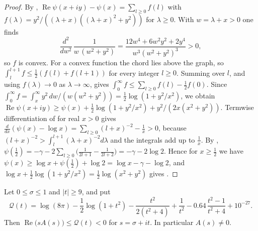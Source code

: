\begin{proof}
By , $\operatorname{Re}\psi(x+iy)-\psi(x)=\sum_{l\ge0}f(l)$ with $f(\lambda)=y^2/((\lambda+x)((\lambda+x)^2+y^2))$ for $\lambda\ge0$. With $w=\lambda+x>0$ one finds
\begin{equation}\label{eq:convex}
\frac{d^2}{dw^2}\,\frac1{w\,(w^2+y^2)}=\frac{12w^4+6w^2y^2+2y^4}{w^3(w^2+y^2)^3}>0,
\end{equation}
so $f$ is convex. For a convex function the chord lies above the graph, so $\int_l^{l+1}f\le\frac12(f(l)+f(l+1))$ for every integer $l\ge0$. Summing over $l$, and using $f(\lambda)\to0$ as $\lambda\to\infty$, gives $\int_0^\infty f\le\sum_{l\ge0}f(l)-\frac12f(0)$. Since $\int_0^\infty f=\int_x^\infty y^2\,dw/(w(w^2+y^2))=\frac12\log(1+y^2/x^2)$, we obtain $\operatorname{Re}\psi(x+iy)\ge\psi(x)+\frac12\log(1+y^2/x^2)+y^2/(2x(x^2+y^2))$. Termwise differentiation of  for real $x>0$ gives $\frac{d}{dx}(\psi(x)-\log x)=\sum_{l\ge0}(l+x)^{-2}-\frac1x>0$, because $(l+x)^{-2}>\int_l^{l+1}(\lambda+x)^{-2}d\lambda$ and the integrals add up to $\frac1x$. By , $\psi(\frac12)=-\gamma-2\sum_{l\ge0}\bigl(\frac1{2l+1}-\frac1{2l+2}\bigr)=-\gamma-2\log2$. Hence for $x\ge\frac12$ we have $\psi(x)\ge\log x+\psi(\frac12)+\log2=\log x-\gamma-\log2$, and $\log x+\frac12\log(1+y^2/x^2)=\frac12\log(x^2+y^2)$ gives .
\end{proof}

\begin{theorem}\label{thm:Anonzero}
Let $0\le\sigma\le1$ and $|t|\ge9$, and put
\begin{equation}\label{eq:Qbound}
\mathcal Q(t)=\log(8\pi)-\frac12\log(1+t^2)-\frac{t^2}{2(t^2+4)}+\frac1{t^2}-0.64\,\frac{t^2-1}{t^2+4}+10^{-27} .
\end{equation}
Then $\operatorname{Re}\bigl(sA(s)\bigr)\le\mathcal Q(t)<0$ for $s=\sigma+it$. In particular $A(s)\ne0$.
\end{theorem}

